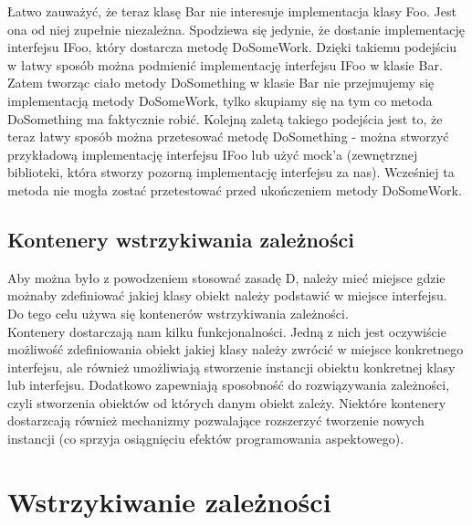 \documentclass[12pt]{article}
\begin{document}
Łatwo zauważyć, że teraz klasę Bar nie interesuje implementacja klasy Foo. Jest ona od niej zupełnie niezależna. Spodziewa się jedynie, że dostanie implementację interfejsu IFoo, który dostarcza metodę DoSomeWork. Dzięki takiemu podejściu w łatwy sposób można podmienić implementację interfejsu IFoo w klasie Bar. Zatem tworząc ciało metody DoSomething w klasie Bar nie przejmujemy się implementacją metody DoSomeWork, tylko skupiamy się na tym co metoda DoSomething ma faktycznie robić.
Kolejną zaletą takiego podejścia jest to, że teraz łatwy sposób można przetesować metodę DoSomething - można stworzyć przykładową implementację interfejsu IFoo lub użyć mock'a (zewnętrznej biblioteki, która stworzy pozorną implementację interfejsu za nas). Wcześniej ta metoda nie mogła zostać przetestować przed ukończeniem metody DoSomeWork.


\subsection{Kontenery wstrzykiwania zależności}
Aby można było z powodzeniem stosować zasadę D, należy mieć miejsce gdzie możnaby zdefiniować jakiej klasy obiekt należy podstawić w miejsce interfejsu. Do tego celu używa się kontenerów wstrzykiwania zależności.\\
Kontenery dostarczają nam kilku funkcjonalności. Jedną z nich jest oczywiście możliwość zdefiniowania obiekt jakiej klasy należy zwrócić w miejsce konkretnego interfejsu, ale również umożliwiają stworzenie instancji obiektu konkretnej klasy lub interfejsu. Dodatkowo zapewniają sposobność do rozwiązywania zależności, czyli stworzenia obiektów od których danym obiekt zależy. Niektóre kontenery dostarzcają również mechanizmy pozwalające rozszerzyć tworzenie nowych instancji (co sprzyja osiągnięciu efektów programowania aspektowego).



\clearpage
\section{Wstrzykiwanie zależności}
\end{document}
